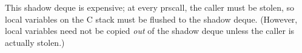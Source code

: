 \documentclass[twoside,12pt]{article}
\begin{document}
This shadow deque is expensive; at every prscall, the caller must be stolen, so local variables on the C stack must be flushed to the shadow deque.  (However, local variables need not be copied \emph{out} of the shadow deque unless the caller is actually stolen.)



\let\osection=\section
\def\section{\clearpage\osection}


\end{document}

